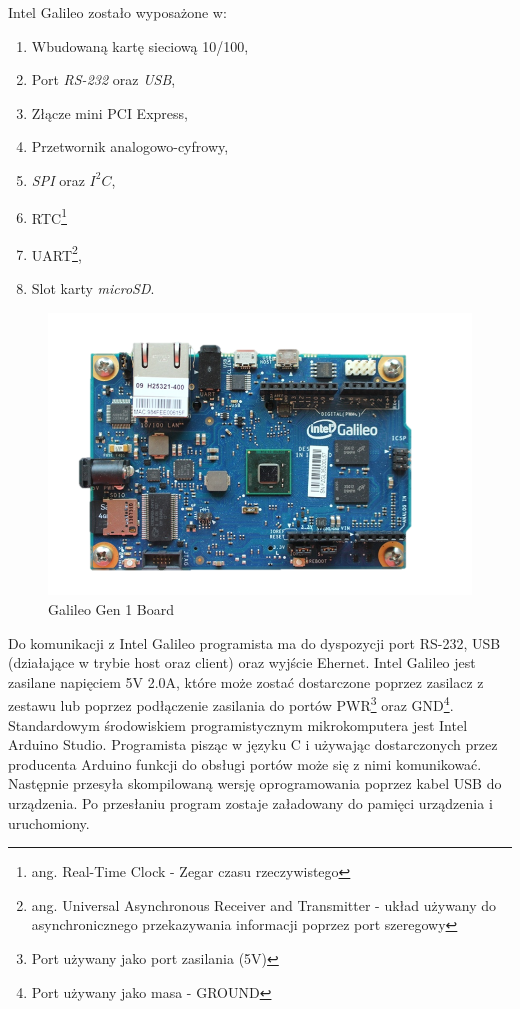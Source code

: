 \documentclass{xmgr}
\begin{document}
Intel Galileo zostało wyposażone w:
\begin{enumerate}
  \item Wbudowaną kartę sieciową 10/100, 
  \item Port \emph{RS-232} oraz \emph{USB},
  \item Złącze mini PCI Express,
  \item Przetwornik analogowo-cyfrowy,
  \item \emph{SPI} oraz $I^2C$,
  \item RTC\footnote{ang. Real-Time Clock - Zegar czasu rzeczywistego}
  \item UART\footnote{ang. Universal Asynchronous Receiver and Transmitter - układ używany do asynchronicznego przekazywania informacji poprzez port szeregowy},
  \item Slot karty \emph{microSD}.\cite{GalileoBook}
\end{enumerate}

\begin{figure}[!h]
    \centering
    \includegraphics[height=0.4\textwidth]{images/galileo.png}
    \caption{Galileo Gen 1 Board \label{Galileo Gen 1 Board}}
\end{figure}

Do komunikacji z Intel Galileo programista ma do dyspozycji port RS-232, USB (działające w trybie host oraz client) oraz wyjście Ehernet. Intel Galileo jest zasilane napięciem 5V 2.0A, które może zostać dostarczone poprzez zasilacz z zestawu lub poprzez podłączenie zasilania do portów PWR\footnote{Port używany jako port zasilania (5V)} oraz GND\footnote{Port używany jako masa - GROUND}. Standardowym środowiskiem programistycznym mikrokomputera jest Intel Arduino Studio. Programista pisząc w języku C i używając dostarczonych przez producenta Arduino funkcji do obsługi portów może się z nimi komunikować. Następnie przesyła skompilowaną wersję oprogramowania poprzez kabel USB do urządzenia. Po przesłaniu program zostaje załadowany do pamięci urządzenia i uruchomiony. 
\end{document}
